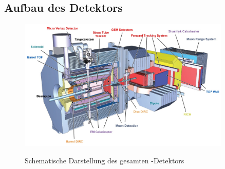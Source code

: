 \subsection{Aufbau des Detektors}
\begin{figure}
  \includegraphics[width=0.9\textwidth]{Bilder/panda_full_detektor}
	\label{fig:panda_full}
	\caption{Schematische Darstellung des gesamten \pnd{}-Detektors}
\end{figure}
